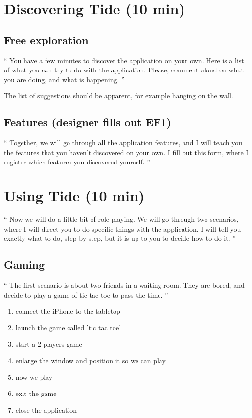 \documentclass[11pt]{amsart}
\begin{document}
\section{Discovering Tide (10 min)}

\subsection{Free exploration}
 
``
You have a few minutes to discover the application on your own.
Here is a list of what you can try to do with the application.
Please, comment aloud on what you are doing, and what is happening.
''

The list of suggestions should be apparent, for example hanging on the wall.


\subsection{Features (designer fills out EF1)}

``
Together, we will go through all the application features, and I will teach you the features that you haven't discovered on your own.
I fill out this form, where I register which features you discovered yourself.
''

\section{Using Tide (10 min)}

``
Now we will do a little bit of role playing. We will go through two scenarios, where I will direct you to do specific things with the application.
I will tell you exactly what to do, step by step, but it is up to you to decide how to do it.
''

\subsection{Gaming}

``
The first scenario is about two friends in a waiting room. They are bored, and decide to play a game of tic-tac-toe to pass the time.
''

\begin{enumerate}
\item connect the iPhone to the tabletop
\item launch the game called 'tic tac toe'
\item start a 2 players game
\item enlarge the window and position it so we can play
\item now we play
\item exit the game
\item close the application
\end{enumerate}
\end{document}
